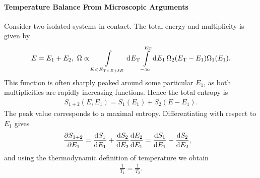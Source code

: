 \paragraph{Temperature Balance From Microscopic Arguments}
Consider two isolated systems in contact. The total energy and multiplicity is given by
\begin{align*}
	E = E_{1} + E_{2},\ \Omega \propto \int\limits_{E < E_{\text{T} < E + \delta E}}^{}\dd[]{E_{\text{T}}}\int\limits_{-\infty}^{E_{\text{T}}}\dd[]{E_{1}}\Omega_{2}(E_{\text{T}} - E_{1})\Omega_{1}(E_{1}).
\end{align*}
This function is often sharply peaked around some particular $E_{1}$, as both multiplicities are rapidly increasing functions. Hence the total entropy is
\begin{align*}
	S_{1 + 2}(E, E_{1}) = S_{1}(E_{1}) + S_{2}(E - E_{1}).
\end{align*}
The peak value corresponds to a maximal entropy. Differentiating with respect to $E_{1}$ gives
\begin{align*}
	\pdv{S_{1 + 2}}{E_{1}}                 &= \dv{S_{1}}{E_{1}} + \dv{S_{2}}{E_{2}}\dv{E_{2}}{E_{1}} = \dv{S_{1}}{E_{1}} - \dv{S_{2}}{E_{2}},
\end{align*}
and using the thermodynamic definition of temperature we obtain
\begin{align*}
	\frac{1}{T_{1}} = \frac{1}{T_{2}}.
\end{align*}

